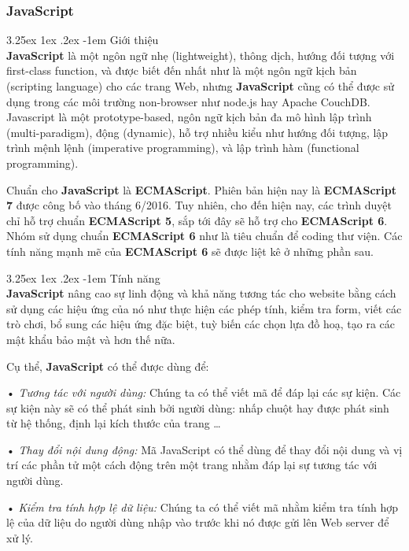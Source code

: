 \documentclass[12pt,a4paper]{article}
\makeatletter
\newcommand{\myparagraph}[1]{\paragraph{#1}\mbox{}\\} %
\renewcommand\paragraph{\@startsection{paragraph}{5}{\z@}%
  {3.25ex \@plus1ex \@minus.2ex}%
  {-1em}%
  {\normalfont\normalsize\bfseries}}
\makeatother
\begin{document}
\subsubsection{JavaScript}
\myparagraph{Giới thiệu}
\textbf{JavaScript} là một ngôn ngữ nhẹ (lightweight), thông dịch, hướng đối tượng với first-class function, và được biết đến nhất như là một ngôn ngữ kịch bản (scripting language) cho các trang Web, nhưng \textbf{JavaScript} cũng có thể được sử dụng trong các môi trường non-browser như node.js hay Apache CouchDB. Javascript là một prototype-based, ngôn ngữ kịch bản đa mô hình lập trình (multi-paradigm), động (dynamic), hỗ trợ nhiều kiểu như hướng đối tượng, lập trình mệnh lệnh (imperative programming), và lập trình hàm (functional programming).

Chuẩn cho \textbf{JavaScript} là \textbf{ECMAScript}. Phiên bản hiện nay là \textbf{ECMAScript 7} được công bố vào tháng 6/2016. Tuy nhiên, cho đến hiện nay, các trình duyệt chỉ hỗ trợ chuẩn \textbf{ECMAScript 5}, sắp tới đây sẽ hỗ trợ cho \textbf{ECMAScript 6}. Nhóm sử dụng chuẩn \textbf{ECMAScript 6} như là tiêu chuẩn để coding thư viện. Các tính năng mạnh mẽ của \textbf{ECMAScript 6} sẽ được liệt kê ở những phần sau.

\myparagraph{Tính năng}
\textbf{JavaScript} nâng cao sự linh động và khả năng tương tác cho website bằng cách sử dụng các hiệu ứng của nó như thực hiện các phép tính, kiểm tra form, viết các trò chơi, bổ sung các hiệu ứng đặc biệt, tuỳ biến các chọn lựa đồ hoạ, tạo ra các mật khẩu bảo mật và hơn thế nữa.

Cụ thể, \textbf{JavaScript} có thể được dùng để:
\begin{list}{}{}
\item[•] \emph{Tương tác với người dùng:} Chúng ta có thể viết mã để đáp lại các sự kiện. Các sự kiện này sẽ có thể phát sinh bởi người dùng: nhấp chuột hay được phát sinh từ hệ thống, định lại kích thước của trang …
\item[•] \emph{Thay đổi nội dung động:} Mã JavaScript có thể dùng để thay đổi nội dung và vị trí các phần tử một cách động trên một trang nhằm đáp lại sự tương tác với người dùng.
\item[•] \emph{Kiểm tra tính hợp lệ dữ liệu:} Chúng ta có thể viết mã nhằm kiểm tra tính hợp lệ của dữ liệu do người dùng nhập vào trước khi nó được gửi lên Web server để xử lý.
\end{list}
\end{document}

